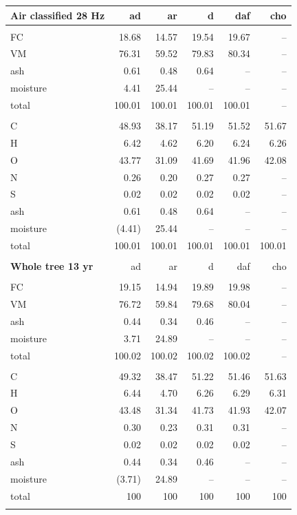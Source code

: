 \documentclass[12pt,titlepage]{article}
\begin{document}
\begin{longtable}{lrrrrr}
    \textbf{Air classified 28 Hz} & ad & ar & d & daf & cho \\
    \hline \\
    FC       & 18.68  & 14.57  & 19.54  & 19.67  & -- \\
    VM       & 76.31  & 59.52  & 79.83  & 80.34  & -- \\
    ash      & 0.61   & 0.48   & 0.64   & --     & -- \\
    moisture & 4.41   & 25.44  & --     & --     & -- \\
    total    & 100.01 & 100.01 & 100.01 & 100.01 & -- \\
    \\
    C        & 48.93  & 38.17  & 51.19  & 51.52  & 51.67 \\
    H        & 6.42   & 4.62   & 6.20   & 6.24   & 6.26 \\
    O        & 43.77  & 31.09  & 41.69  & 41.96  & 42.08 \\
    N        & 0.26   & 0.20   & 0.27   & 0.27   & -- \\
    S        & 0.02   & 0.02   & 0.02   & 0.02   & -- \\
    ash      & 0.61   & 0.48   & 0.64   & --     & -- \\
    moisture & (4.41) & 25.44  & --     & --     & -- \\
    total    & 100.01 & 100.01 & 100.01 & 100.01 & 100.01 \\
    \\

    \textbf{Whole tree 13 yr} & ad & ar & d & daf & cho \\
    \hline \\
    FC       & 19.15  & 14.94  & 19.89  & 19.98  & -- \\
    VM       & 76.72  & 59.84  & 79.68  & 80.04  & -- \\
    ash      & 0.44   & 0.34   & 0.46   & --     & -- \\
    moisture & 3.71   & 24.89  & --     & --     & -- \\
    total    & 100.02 & 100.02 & 100.02 & 100.02 & -- \\
    \\
    C        & 49.32  & 38.47  & 51.22  & 51.46  & 51.63 \\
    H        & 6.44   & 4.70   & 6.26   & 6.29   & 6.31 \\
    O        & 43.48  & 31.34  & 41.73  & 41.93  & 42.07 \\
    N        & 0.30   & 0.23   & 0.31   & 0.31   & -- \\
    S        & 0.02   & 0.02   & 0.02   & 0.02   & -- \\
    ash      & 0.44   & 0.34   & 0.46   & --     & -- \\
    moisture & (3.71) & 24.89  & --     & --     & -- \\
    total    & 100    & 100    & 100    & 100    & 100 \\
    \\


\end{longtable}
\end{document}
